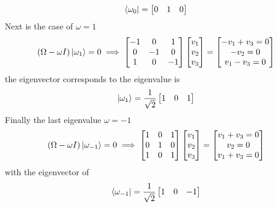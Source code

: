 \documentclass[../../../main.tex]{subfiles}
\begin{document}
\begin{equation*}
	\bra{\omega_0}=
	\begin{bmatrix}
		0 & 1 & 0 \\
	\end{bmatrix}
\end{equation*}
Next is the case of $\omega=1$
\begin{equation*}
	(\Omega-\omega I)\ket{\omega_1}=0\implies
	\begin{bmatrix}
		-1 & 0  & 1  \\
		0  & -1 & 0  \\
		1  & 0  & -1 \\
	\end{bmatrix}
	\begin{bmatrix}
		v_1 \\
		v_2 \\
		v_3 \\
	\end{bmatrix}
	=
	\begin{bmatrix}
		-v_1+v_3=0 \\
		-v_2=0     \\
		v_1-v_3=0
	\end{bmatrix}
\end{equation*}
the eigenvector corresponds to the eigenvalue is
\begin{equation*}
	\ket{\omega_1}=\frac{1}{\sqrt{2}}
	\begin{bmatrix}
		1 & 0 & 1
	\end{bmatrix}
\end{equation*}
Finally the last eigenvalue $\omega=-1$
\begin{equation*}
	(\Omega-\omega I)\ket{\omega_{-1}}=0\implies
	\begin{bmatrix}
		1 & 0 & 1 \\
		0 & 1 & 0 \\
		1 & 0 & 1 \\
	\end{bmatrix}
	\begin{bmatrix}
		v_1 \\
		v_2 \\
		v_3 \\
	\end{bmatrix}
	=
	\begin{bmatrix}
		v_1+v_3=0 \\
		v_2=0     \\
		v_1+v_3=0
	\end{bmatrix}
\end{equation*}
with the eigenvector of
\begin{equation*}
	\bra{\omega_{-1}}=\frac{1}{\sqrt{2}}
	\begin{bmatrix}
		1 & 0 & -1
	\end{bmatrix}
\end{equation*}
\end{document}
